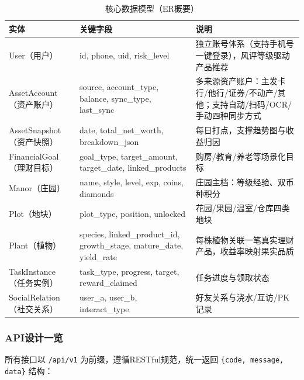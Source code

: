 \documentclass[12pt,a4paper]{ctexart}
\begin{document}
\begin{table}[htbp]
\centering
\begin{tabular}{p{3.2cm}p{4.2cm}p{5.2cm}}
\toprule
\textbf{实体} & \textbf{关键字段} & \textbf{说明} \\
\midrule
User（用户） & id, phone, uid, risk\_level & 独立账号体系（支持手机号一键登录），风评等级驱动产品推荐 \\
AssetAccount（资产账户） & source, account\_type, balance, sync\_type, last\_sync & 多来源资产账户：主发卡行/他行/证券/不动产/其他；支持自动/扫码/OCR/手动四种同步方式 \\
AssetSnapshot（资产快照） & date, total\_net\_worth, breakdown\_json & 每日打点，支撑趋势图与收益归因 \\
FinancialGoal（理财目标） & goal\_type, target\_amount, target\_date, linked\_products & 购房/教育/养老等场景化目标 \\
Manor（庄园） & name, style, level, exp, coins, diamonds & 庄园主档：等级经验、双币种积分 \\
Plot（地块） & plot\_type, position, unlocked & 花园/果园/温室/仓库四类地块 \\
Plant（植物） & species, linked\_product\_id, growth\_stage, mature\_date, yield\_rate & 每株植物关联一笔真实理财产品，收益率映射果实品质 \\
TaskInstance（任务实例） & task\_type, progress, target, reward\_claimed & 任务进度与领取状态 \\
SocialRelation（社交关系） & user\_a, user\_b, interact\_type & 好友关系与浇水/互访/PK记录 \\
\bottomrule
\end{tabular}
\caption{核心数据模型（ER概要）}
\end{table}

\subsubsection{API设计一览}
所有接口以 \texttt{/api/v1} 为前缀，遵循RESTful规范，统一返回
\texttt{\{code, message, data\}} 结构：
\end{document}

